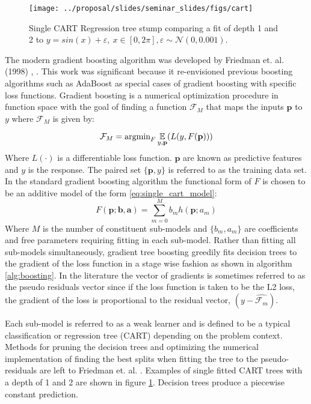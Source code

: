 \begin{figure}[H]
    \centering
    \texttt{[image: ../proposal/slides/seminar\_slides/figs/cart]}
    \caption[Regression tree stump.]{Single CART Regression tree stump comparing a fit of depth 1 and 2 to $y=sin(x) + \varepsilon,\ x\in[0,2\pi], \varepsilon \sim \mathcal N(0,0.001)$.}
    \label{fig:cart}
\end{figure}

The modern gradient boosting algorithm was developed by Friedman et. al. (1998) \cite{friedman1998}, \cite{friedman2001}.  This work was significant because it re-envisioned previous boosting algorithms such as AdaBoost as special cases of gradient boosting with specific loss functions.  Gradient boosting is a numerical optimization procedure in function space with the goal of finding a function $\mathcal F_M$ that maps the inputs $\mathbf p$ to $y$ where $\mathcal F_M$ is given by:

\begin{equation}
\mathcal F_M = \text{argmin}_F \operatorname*{\mathbb{E}}_{y, \mathbf p} (L(y, F(\mathbf p)))
\end{equation}
Where $L(\cdot)$ is a differentiable loss function.  $\mathbf p$ are known as predictive features and $y$ is the response.  The paired set $\{\mathbf p, y \}$ is referred to as the training data set.  In the standard gradient boosting algorithm the functional form of $F$ is chosen to be an additive model of the form \ref{eq:single_cart_model}:
\begin{equation}
F(\mathbf p; \mathbf{b}, \mathbf a) = \sum_{m=0}^M b_m h(\mathbf p; a_m)
\label{eq:single_cart_model}
\end{equation} 
Where $M$ is the number of constituent sub-models and $\{b_m, a_m\}$ are coefficients and free parameters requiring fitting in each sub-model.
Rather than fitting all sub-models simultaneously, 
gradient tree boosting greedily fits decision trees to the gradient of the loss function in a stage wise fashion as shown in algorithm \ref{alg:boosting}.  In the literature the vector of gradients is sometimes referred to as the pseudo residuals vector since if the loss function is taken to be the L2 loss, the gradient of the loss is proportional to the residual vector, $(y - \hat {\mathcal F_{m}})$.  

Each sub-model is referred to as a weak learner and is defined to be a typical classification or regression tree (CART) depending on the problem context.  Methods for pruning the decision trees and optimizing the numerical implementation of finding the best splits when fitting the tree to the pseudo-residuals are left to Friedman et. al. \cite{friedman2002}.  Examples of single fitted CART trees with a depth of 1 and 2 are shown in figure \ref{fig:cart}.  Decision trees produce a piecewise constant prediction.  

